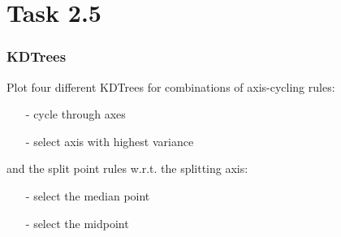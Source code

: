 \documentclass{beamer}
\begin{document}
\section{Task 2.5}
\begin{frame}
	\frametitle{KDTrees}
	Plot four different KDTrees for combinations of  axis-cycling rules:
	\begin{itemize}
		\item[-] cycle through axes
		\item[-] select axis with highest variance
	\end{itemize}
	and the split point  rules w.r.t. the splitting axis:
	\begin{itemize}
		\item[-] select the median point
		\item[-] select the midpoint
	\end{itemize}
\end{frame}
\end{document}
